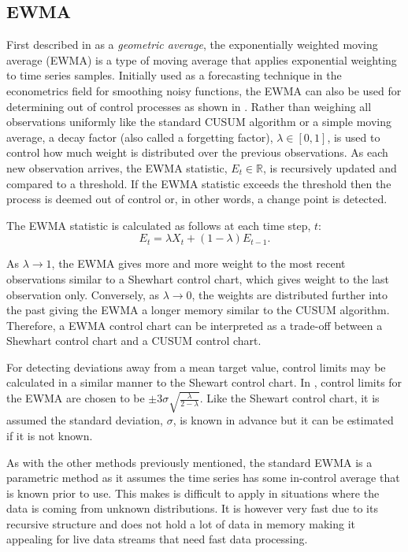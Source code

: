 \subsection{EWMA}
\label{ewma}
First described in \cite{roberts1959control} as a \textit{geometric average}, the exponentially weighted moving average (EWMA) is a type of moving average that applies exponential weighting to time series samples. Initially used as a forecasting technique in the econometrics field for smoothing noisy functions, the EWMA can also be used for determining out of control processes as shown in \cite{hunter1986exponentially}. Rather than weighing all observations uniformly like the standard CUSUM algorithm or a simple moving average, a decay factor (also called a  forgetting factor), $\lambda \in [0,1]$, is used to control how much weight is distributed over the previous observations. As each new observation arrives, the EWMA statistic, $E_t \in \mathbb{R}$, is recursively updated and compared to a threshold. If the EWMA statistic exceeds the threshold then the process is deemed out of control or, in other words, a change point is detected.

The EWMA statistic is calculated as follows at each time step, $t$:
$$E_t = \lambda X_t + (1-\lambda)E_{t-1}. $$

As $\lambda \to 1$, the EWMA gives more and more weight to the most recent observations similar to a Shewhart control chart, which gives weight to the last observation only. Conversely, as $\lambda \to 0$, the weights are distributed further into the past giving the EWMA a longer memory similar to the CUSUM algorithm. Therefore, a EWMA control chart can be interpreted as a trade-off between a Shewhart control chart and a CUSUM control chart. 

For detecting deviations away from a mean target value, control limits may be calculated in a similar manner to the Shewart control chart. In \cite{hunter1986exponentially}, control limits for the EWMA are chosen to be  $\pm 3 \sigma \sqrt{\frac{\lambda}{2-\lambda}}$.  Like the Shewart control chart, it is assumed the standard deviation, $\sigma$, is known in advance but it can be estimated if it is not known. %


As with the other methods previously mentioned, the standard EWMA is a parametric method as it assumes the time series has some in-control average that is known prior to use. This makes is difficult to apply in situations where the data is coming from unknown distributions. It is however very fast due to its recursive structure and does not hold a lot of data in memory making it appealing for live data streams that need fast data processing.